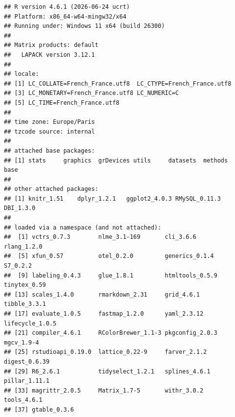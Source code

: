 \documentclass[mstat,12pt]{unswthesis}
\begin{document}
\begin{verbatim}
## R version 4.6.1 (2026-06-24 ucrt)
## Platform: x86_64-w64-mingw32/x64
## Running under: Windows 11 x64 (build 26300)
## 
## Matrix products: default
##   LAPACK version 3.12.1
## 
## locale:
## [1] LC_COLLATE=French_France.utf8  LC_CTYPE=French_France.utf8   
## [3] LC_MONETARY=French_France.utf8 LC_NUMERIC=C                  
## [5] LC_TIME=French_France.utf8    
## 
## time zone: Europe/Paris
## tzcode source: internal
## 
## attached base packages:
## [1] stats     graphics  grDevices utils     datasets  methods   base     
## 
## other attached packages:
## [1] knitr_1.51    dplyr_1.2.1   ggplot2_4.0.3 RMySQL_0.11.3 DBI_1.3.0    
## 
## loaded via a namespace (and not attached):
##  [1] vctrs_0.7.3        nlme_3.1-169       cli_3.6.6          rlang_1.2.0       
##  [5] xfun_0.57          otel_0.2.0         generics_0.1.4     S7_0.2.2          
##  [9] labeling_0.4.3     glue_1.8.1         htmltools_0.5.9    tinytex_0.59      
## [13] scales_1.4.0       rmarkdown_2.31     grid_4.6.1         tibble_3.3.1      
## [17] evaluate_1.0.5     fastmap_1.2.0      yaml_2.3.12        lifecycle_1.0.5   
## [21] compiler_4.6.1     RColorBrewer_1.1-3 pkgconfig_2.0.3    mgcv_1.9-4        
## [25] rstudioapi_0.19.0  lattice_0.22-9     farver_2.1.2       digest_0.6.39     
## [29] R6_2.6.1           tidyselect_1.2.1   splines_4.6.1      pillar_1.11.1     
## [33] magrittr_2.0.5     Matrix_1.7-5       withr_3.0.2        tools_4.6.1       
## [37] gtable_0.3.6
\end{verbatim}
\end{document}
